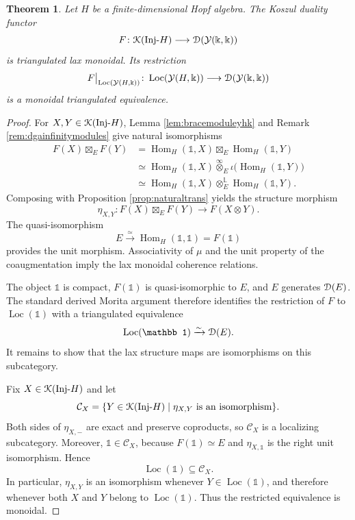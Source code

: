 \documentclass[a4paper, 11pt]{amsart}
\newtheorem{thm}{Theorem}[section]
\theoremstyle{definition}
\theoremstyle{remark}
\numberwithin{equation}{section}
\newcommand{\Y}{\mathcal{Y}}
\newcommand{\ED}{\EuScript{D}}
\newcommand{\EK}{\EuScript{K}}
\begin{document}
\begin{thm}\label{thm:monoidalfunctor}
Let $H$ be a finite-dimensional Hopf algebra. The Koszul duality functor
\[
F\colon\EK(\mathrm{Inj}\text{-}H)\longrightarrow\ED(\Y(\Bbbk,\Bbbk))
\]
is triangulated lax monoidal. Its restriction
\[
F\big|_{\operatorname{Loc}(\Y(H,\Bbbk))}
\colon
\operatorname{Loc}(\Y(H,\Bbbk))
\longrightarrow
\ED(\Y(\Bbbk,\Bbbk))
\]
is a monoidal triangulated equivalence.
\end{thm}
\begin{proof}
For $X,Y\in\EK(\mathrm{Inj}\text{-}H)$, Lemma \ref{lem:bracemoduleyhk} and Remark \ref{rem:dgainfinitymodules} give natural isomorphisms
\begin{align*}
F(X)\boxtimes_E F(Y)
 & =\operatorname{Hom}_H(\mathbb 1,X)\boxtimes_E\operatorname{Hom}_H(\mathbb 1,Y)\\
 &\simeq\operatorname{Hom}_H(\mathbb 1,X)
 \overset{\infty}{\otimes}_E
 \iota\bigl(\operatorname{Hom}_H(\mathbb 1,Y)\bigr)\\
 &\simeq\operatorname{Hom}_H(\mathbb 1,X)
 \otimes_E^{\mathbb L}
 \operatorname{Hom}_H(\mathbb 1,Y).
\end{align*}
Composing with Proposition \ref{prop:naturaltrans} yields the structure morphism
\[
\eta_{X,Y}\colon F(X)\boxtimes_E F(Y)\longrightarrow F(X\otimes Y).
\]
The quasi-isomorphism
\[
E\xrightarrow{\simeq}\operatorname{Hom}_H(\mathbb 1,\mathbb 1)=F(\mathbb 1)
\]
provides the unit morphism. Associativity of $\mu$ and the unit property of the coaugmentation imply the lax monoidal coherence relations.

The object $\mathbb 1$ is compact, $F(\mathbb 1)$ is quasi-isomorphic to $E$, and $E$ generates $\ED(E)$. The standard derived Morita argument therefore identifies the restriction of $F$ to $\operatorname{Loc}(\mathbb 1)$ with a triangulated equivalence
\[
\operatorname{Loc}(\mathbb 1)\xrightarrow{\sim}\ED(E).
\]
It remains to show that the lax structure maps are isomorphisms on this subcategory.

Fix $X\in\EK(\mathrm{Inj}\text{-}H)$ and let
\[
\mathcal C_X=\{Y\in\EK(\mathrm{Inj}\text{-}H)\mid
\eta_{X,Y}\text{ is an isomorphism}\}.
\]
Both sides of $\eta_{X,-}$ are exact and preserve coproducts, so $\mathcal C_X$ is a localizing subcategory. Moreover, $\mathbb 1\in\mathcal C_X$, because $F(\mathbb 1)\simeq E$ and $\eta_{X,\mathbb 1}$ is the right unit isomorphism. Hence
\[
\operatorname{Loc}(\mathbb 1)\subseteq\mathcal C_X.
\]
In particular, $\eta_{X,Y}$ is an isomorphism whenever $Y\in\operatorname{Loc}(\mathbb 1)$, and therefore whenever both $X$ and $Y$ belong to $\operatorname{Loc}(\mathbb 1)$. Thus the restricted equivalence is monoidal.
\end{proof}
\end{document}
